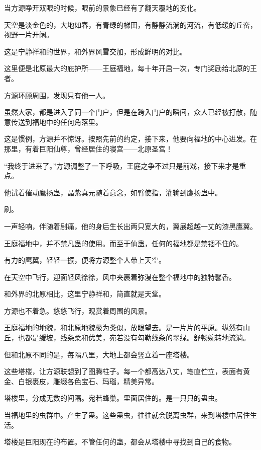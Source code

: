 
\begin{this_body}

当方源睁开双眼的时候，眼前的景象已经有了翻天覆地的变化。

天空是淡金色的，大地如春，有青绿的梯田，有静静流淌的河流，有低缓的丘峦，视野一片开阔。

这是宁静祥和的世界，和外界风雪交加，形成鲜明的对比。

这里便是北原最大的庇护所——王庭福地，每十年开启一次，专门奖励给北原的王者。

方源环顾周围，发现只有他一人。

虽然大家，都是进入了同一个门户，但是在跨入门户的瞬间，众人已经被打散，随意传送到福地中的任何角落里。

这是惯例，方源并不惊讶。按照先前的约定，接下来，他要向福地的中心进发。在那里，有着巨阳仙尊，曾经居住的寝宫——北原圣宫！

“我终于进来了。”方源调整了一下呼吸，王庭之争不过只是前戏，接下来才是重点。

他试着催动鹰扬蛊，晶紫真元随着意念，如臂使指，灌输到鹰扬蛊中。

刷。

一声轻响，伴随着剧痛，他的身后生长出两只宽大的，翼展超越一丈的漆黑鹰翼。

王庭福地中，并不禁凡蛊的使用。而至于仙蛊，任何的福地都是禁锢不住的。

有力的鹰翼，轻轻一振，便将方源整个人带上天空。

在天空中飞行，迎面轻风徐徐，风中夹裹着弥漫在整个福地中的独特馨香。

和外界的北原相比，这里宁静祥和，简直就是天堂。

方源也不着急。悠悠飞行，观赏着周围的风景。

王庭福地的地貌，和北原地貌极为类似，放眼望去。是一片片的平原。纵然有山丘，也都是缓坡，线条柔和优美，宛若没有勾勒线条的翠绿。舒畅婉转地流淌。

但和北原不同的是，每隔八里，大地上都会竖立着一座塔楼。

这些塔楼，让方源联想到了图腾柱子。每一个都高达八丈，笔直伫立，表面有黄金、白银裹皮，雕缀各色宝石、玛瑙，精美异常。

塔楼里，分成无数的间隔。宛若蜂巢。里面居住的。是一只只的蛊虫。

当福地里的虫群中。产生了蛊。这些蛊虫，往往就会脱离虫群，来到塔楼中居住生活。

塔楼是巨阳现在的布置。不管任何的蛊，都会从塔楼中寻找到自己的食物。


\end{this_body}
